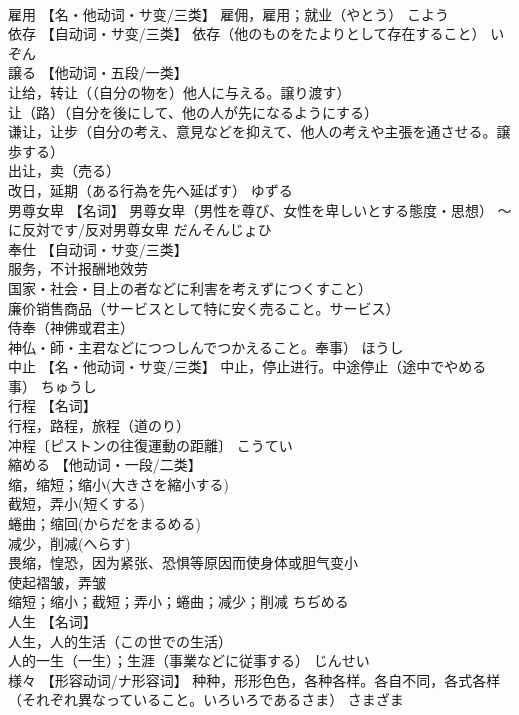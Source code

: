 \documentclass[8pt]{extreport}
\begin{document}
\begin{CJK}{UTF8}{min}
\\	雇用	【名・他动词・サ变/三类】 雇佣，雇用；就业（やとう）	こよう	
\\	依存	【自动词・サ变/三类】 依存（他のものをたよりとして存在すること）	いぞん	
\\	譲る	【他动词・五段/一类】 
\\	让给，转让（（自分の物を）他人に与える。譲り渡す） 
\\	让（路）（自分を後にして、他の人が先になるようにする） 
\\	谦让，让步（自分の考え、意見などを抑えて、他人の考えや主張を通させる。譲歩する） 
\\	出让，卖（売る） 
\\	改日，延期（ある行為を先へ延ばす）	ゆずる	
\\	男尊女卑	【名词】 男尊女卑（男性を尊び、女性を卑しいとする態度・思想） 〜に反対です/反对男尊女卑	だんそんじょひ	
\\	奉仕	【自动词・サ变/三类】 
\\	服务，不计报酬地效劳
\\	国家・社会・目上の者などに利害を考えずにつくすこと） 
\\	廉价销售商品（サービスとして特に安く売ること。サービス） 
\\	侍奉（神佛或君主）
\\	神仏・師・主君などにつつしんでつかえること。奉事）	ほうし	
\\	中止	【名・他动词・サ变/三类】 中止，停止进行。中途停止（途中でやめる事）	ちゅうし	
\\	行程	【名词】 
\\	行程，路程，旅程（道のり） 
\\	冲程〔ピストンの往復運動の距離〕	こうてい	
\\	縮める	【他动词・一段/二类】 
\\	缩，缩短；缩小(大きさを縮小する) 
\\	截短，弄小(短くする) 
\\	蜷曲；缩回(からだをまるめる) 
\\	减少，削减(へらす) 
\\	畏缩，惶恐，因为紧张、恐惧等原因而使身体或胆气变小 
\\	使起褶皱，弄皱 
\\	缩短；缩小；截短；弄小；蜷曲；减少；削减	ちぢめる	
\\	人生	【名词】 
\\	人生，人的生活（この世での生活） 
\\	人的一生（一生）；生涯（事業などに従事する）	じんせい	
\\	様々	【形容动词/ナ形容词】 种种，形形色色，各种各样。各自不同，各式各样（それぞれ異なっていること。いろいろであるさま）	さまざま	

\end{CJK}
\end{document}
